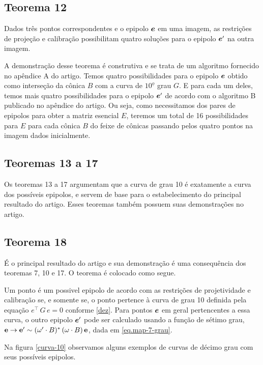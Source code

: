 \subsection*{Teorema 12}
\begin{teorema}
Dados três pontos correspondentes e o epipolo $\boldsymbol{e}$
em uma imagem, as restrições de projeção e calibração possibilitam quatro soluções para o epipolo $\boldsymbol{e}'$ na outra imagem.
\end{teorema}
A demonstração desse teorema é construtiva e se trata de um algoritmo fornecido no apêndice A do artigo. Temos quatro possibilidades para o epipolo $\boldsymbol{e}$ obtido como interseção da cônica $B$ com a curva de $10^{\underline{o}}$ grau $G$. E para cada um deles, temos  mais quatro possibilidades para o epipolo $\boldsymbol{e}'$ de acordo com o algoritmo B publicado no apêndice do artigo. Ou seja, como necessitamos dos pares de epipolos para obter a matriz esencial $E$, teremos um total de 16 possibilidades para $E$ para cada cônica $B$ do feixe de cônicas passando pelos quatro pontos na imagem dados inicialmente. 


\subsection*{Teoremas 13 a 17}
Os teoremas 13 a 17 argumentam que a curva de grau 10 é exatamente a curva dos possíveis epipolos, e servem de base para o estabelecimento do principal resultado do artigo. Esses teoremas também possuem suas demonstrações no artigo.  

\subsection*{Teorema 18}
É o principal resultado do artigo e sua demonstração é uma consequência dos teoremas 7, 10 e 17. O teorema é colocado como segue.

\begin{teorema}
Um ponto é um possivel epipolo de acordo com as restrições de projetividade e calibração se, e somente se, o ponto pertence à curva de grau 10 definida pela equação $e^\top\,G\,e=0$ conforme \ref{dez}. Para pontos $\boldsymbol{e}$ em geral pertencentes a essa curva, o outro epipolo $\boldsymbol{e}'$ pode ser calculado usando a função de sétimo grau, ${\bf e} \rightarrow {\bf e'} \sim (\omega' \cdot B)^*\,(\omega \cdot B)\,{\bf e}
$, dada em \ref{eq.map-7-grau}.
\end{teorema}

Na figura \ref{curva-10} observamos alguns exemplos de curvas de décimo grau com seus possíveis epipolos. 

